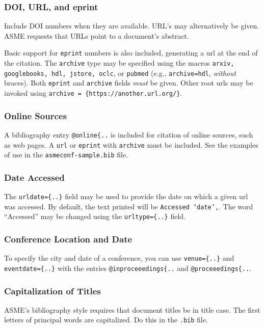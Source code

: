 \documentclass[balance,upint,subscriptcorrection,varvw,mathalfa=cal=boondoxo,spanish,french,vietnamese,russian,greek,pdf-a,colorlinks]{asmeconf}
\begin{document}
\subsubsection*{DOI, URL, and eprint} Include DOI numbers when they are available.  URL's may alternatively be given. ASME requests that URLs point to a document's abstract.

Basic support for \texttt{eprint} numbers is also included, generating a url at the end of the citation. The \texttt{archive} type may be specified using the macros \texttt{arxiv, google\-books, hdl, jstore, oclc}, or \texttt{pubmed} (e.g., \texttt{archive=hdl},  \textit{without} braces). Both \texttt{eprint} and \texttt{archive} fields \textit{must} be given. Other root urls may be invoked using \verb|archive = {https://another.url.org/}|.

\subsubsection*{Online Sources} A bibliography entry \verb|@online{..| is included for citation of online sources, such as web pages. A \texttt{url} or \texttt{eprint} with \texttt{archive} must be included. See the examples of use in the \texttt{asmeconf-sample.bib} file. 

\subsubsection*{Date Accessed} The \verb|urldate={..}| field may be used to provide the date on which a given url was accessed. By default, the text printed will be \texttt{Accessed `date',}. The word ``Accessed'' may be changed using the \verb|urltype={..}| field.

\subsubsection*{Conference Location and Date} To specify the city and date of a conference, you can use \verb|venue={..}| and \verb|eventdate={..}| with the entries \verb|@inproceeedings{..| and \verb|@proceeedings{..|.

\subsubsection*{Capitalization of Titles} ASME's bibliography style requires that document titles be in title case. The first letters of principal words are capitalized. Do this in the \texttt{.bib} file.
\end{document}
